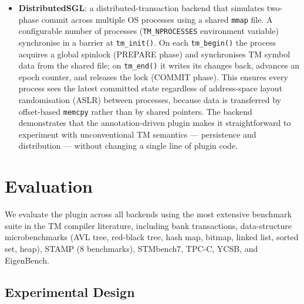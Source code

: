 \documentclass[article,12pt]{article}
\begin{document}
\begin{itemize}
  For heap-based containers like \texttt{std::map}, the persistent allocator
  alone is insufficient because the constructor allocates a sentinel node on
  the system heap before \texttt{tm\_init()} restores tree pointers.  A
  \textbf{\texttt{PSTATIC\_REBUILD}} annotation is provided: functions
  annotated \texttt{TX PSTATIC\_REBUILD} store key-value pairs in
  TM-annotated arrays during execution and are automatically called by the
  plugin after \texttt{tm\_init()} to rebuild the in-memory container from the
  persisted arrays.  Because the rebuild function is \texttt{TX}, allocations
  go through \texttt{tm\_malloc} to the persistent heap, and the fixed-address
  mmap ensures tree-node pointers remain valid across restarts.

\item \textbf{DistributedSGL}: a distributed-transaction backend that
  simulates two-phase commit across multiple OS processes using a shared
  \texttt{mmap} file.  A configurable number of processes
  (\texttt{TM\_NPROCESSES} environment variable) synchronise in a barrier
  at \texttt{tm\_init()}.  On each \texttt{tm\_begin()} the process acquires
  a global spinlock (PREPARE phase) and synchronises TM symbol data from
  the shared file; on \texttt{tm\_end()} it writes its changes back,
  advances an epoch counter, and releases the lock (COMMIT phase).
  This ensures every process sees the latest committed state regardless
  of address-space layout randomisation (ASLR) between processes, because
  data is transferred by offset-based \texttt{memcpy} rather than by
  shared pointers.  The backend demonstrates that the annotation-driven
  plugin makes it straightforward to experiment with unconventional TM
  semantics --- persistence and distribution --- without changing a single
  line of plugin code.
\end{itemize}

\section{Evaluation}\label{sec:evaluation}

We evaluate the plugin across all backends using the most extensive benchmark
suite in the TM compiler literature, including bank transactions, data-structure
microbenchmarks (AVL tree, red-black tree, hash map, bitmap, linked list,
sorted set, heap), STAMP (8 benchmarks), STMbench7, TPC-C, YCSB, and EigenBench.

\subsection{Experimental Design}
\end{document}
